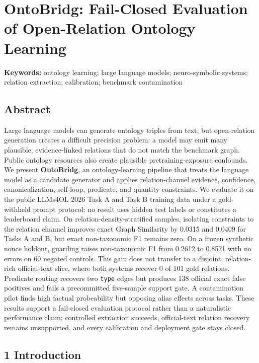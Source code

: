 \documentclass[
]{article}
\author{}
\date{}
\begin{document}
\section{OntoBridg: Fail-Closed Evaluation of Open-Relation Ontology
Learning}\label{ontobridg-fail-closed-evaluation-of-open-relation-ontology-learning}

\textbf{Keywords:} ontology learning; large language models;
neuro-symbolic systems; relation extraction; calibration; benchmark
contamination

\subsection{Abstract}\label{abstract}

Large language models can generate ontology triples from text, but
open-relation generation creates a difficult precision problem: a model
may emit many plausible, evidence-linked relations that do not match the
benchmark graph. Public ontology resources also create plausible
pretraining-exposure confounds. We present \textbf{OntoBridg}, an
ontology-learning pipeline that treats the language model as a candidate
generator and applies relation-channel evidence, confidence,
canonicalization, self-loop, predicate, and quantity constraints. We
evaluate it on the public LLMs4OL 2026 Task A and Task B training data
under a gold-withheld prompt protocol; no result uses hidden test labels
or constitutes a leaderboard claim. On relation-density-stratified
samples, isolating constraints to the relation channel improves exact
Graph Similarity by 0.0315 and 0.0409 for Tasks A and B, but exact
non-taxonomic F1 remains zero. On a frozen synthetic nonce holdout,
guarding raises non-taxonomic F1 from 0.2612 to 0.8571 with no errors on
60 negated controls. This gain does not transfer to a disjoint,
relation-rich official-text slice, where both systems recover 0 of 101
gold relations. Predicate routing recovers two \texttt{type} edges but
produces 138 official exact false positives and fails a precommitted
five-sample support gate. A contamination pilot finds high factual
probeability but opposing alias effects across tasks. These results
support a fail-closed evaluation protocol rather than a naturalistic
performance claim: controlled extraction succeeds, official-text
relation recovery remains unsupported, and every calibration and
deployment gate stays closed.

\subsection{1 Introduction}\label{introduction}
\end{document}
